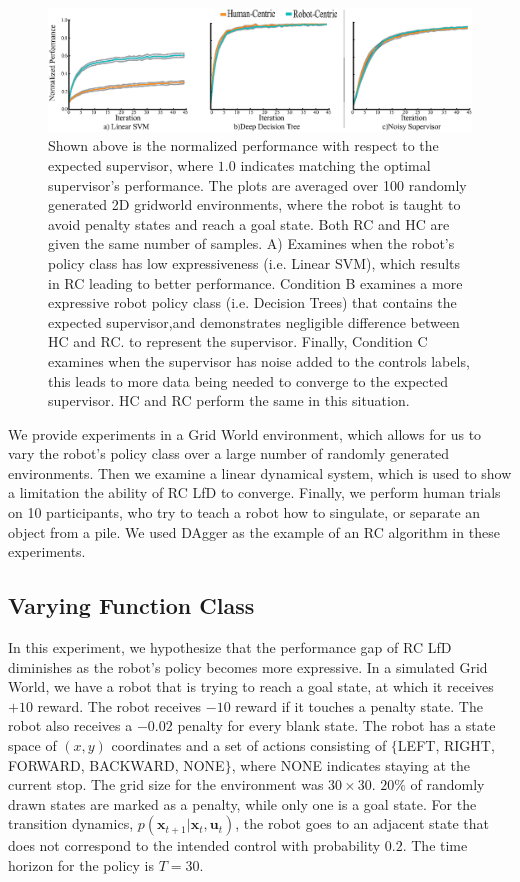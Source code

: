 \documentclass[10pt, conference]{ieeeconf}      %
\newcommand{\bu}{\mathbf{u}}
\newcommand{\bx}{\mathbf{x}}
\begin{document}
\begin{figure}
\includegraphics{f_figs/var_grid.eps}
\caption{
    \footnotesize
Shown above is the normalized performance with respect to the expected supervisor, where $1.0$ indicates matching the optimal supervisor's performance. The plots are averaged over 100 randomly generated 2D gridworld environments,  where the robot is taught to avoid penalty states and reach a goal state. Both RC and HC are given the same number of samples. A) Examines when the robot's policy class has low expressiveness (i.e. Linear SVM), which results in RC  leading to better performance. Condition B examines a more expressive robot policy class (i.e. Decision Trees) that contains the expected supervisor,and demonstrates negligible difference between HC and RC.  to represent the supervisor.  Finally, Condition C examines when the supervisor has noise added to the controls labels, this leads to more data being needed to converge to the expected supervisor. HC and RC perform the same in this situation.  }
\vspace*{-20pt}
\label{fig:var}
\end{figure}

We provide experiments in a  Grid World environment, which allows for us to vary the robot's policy class over a large number of randomly generated environments. Then we examine a linear dynamical system, which is used to show a limitation the ability of RC LfD to converge. Finally, we perform human trials on 10 participants, who try to teach a robot how to singulate, or separate an object from a pile. We used DAgger as the example of an RC algorithm in these experiments. 

\subsection{Varying Function Class}\label{sec:gdw}
In this experiment, we hypothesize that the performance gap of RC LfD diminishes as the robot's policy becomes more expressive. In a simulated Grid World, we have a robot that is trying to reach a goal state, at which it receives $+10$ reward. The robot receives $-10$ reward if it touches a penalty state. The robot also receives a $-0.02$ penalty for every blank state. The robot has a state space of $(x,y)$ coordinates and a set of actions consisting of $\lbrace$LEFT, RIGHT, FORWARD, BACKWARD, NONE$\rbrace$, where NONE indicates staying at the current stop. The grid size for the environment was $30 \times 30$. $20\%$ of randomly drawn states are marked as a penalty, while only one is a goal state. For the transition dynamics, $p(\bx_{t+1}|\bx_{t},\bu_t)$, the robot goes to an adjacent state that does not correspond to the intended control with probability $0.2$.  The time horizon for the policy is $T=30$. 
\end{document}
